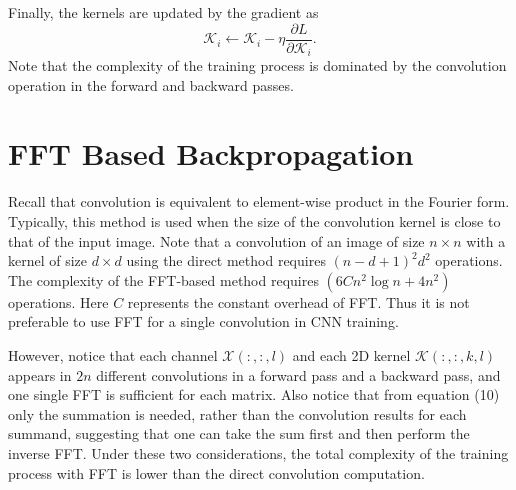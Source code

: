 Finally, the kernels are updated by the gradient as
\begin{equation}
\mathcal{K}_i \leftarrow \mathcal{K}_i - \eta\frac{\partial L}{\partial\mathcal{K}_i}.
\end{equation}
Note that the complexity of the training process is dominated by the convolution operation in the forward and backward passes.


\section{FFT Based Backpropagation}

Recall that convolution is equivalent to element-wise product in the Fourier form. Typically, this method is used when the size of the convolution kernel is close to that of the input image. Note that a convolution of an image of size $n\times n$ with a kernel of size $d\times d$ using the direct method requires $(n - d + 1)^2d^2$
 operations. The complexity of the FFT-based method requires $(6Cn^2\log n+4n^2)$ operations. Here $C$ represents the constant overhead of FFT. Thus it is not preferable to use FFT for a single convolution in CNN training.
 
However, notice that each channel $\mathcal{X}(:,:,l)$ and each 2D kernel $\mathcal{K}(:,:,k,l)$ appears in $2n$ different convolutions in a forward pass and a backward pass, and one single FFT is sufficient for each matrix. Also notice that from equation (10) only the summation is needed, rather than the convolution results for each summand, suggesting that one can take the sum first and then perform the inverse FFT. Under these two considerations, the total complexity of the training process with FFT is lower than the direct convolution computation.

